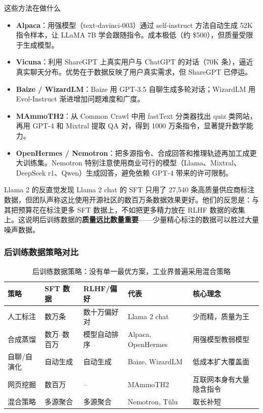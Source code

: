 \begin{knowledgebox}{这些方法在做什么}
\begin{itemize}
    \item \textbf{Alpaca}：用强模型（text-davinci-003）通过 self-instruct 方法自动生成 52K 指令样本，让 LLaMA 7B 学会跟随指令。成本极低（约 \$500），但质量受限于生成模型。
    \item \textbf{Vicuna}：利用 ShareGPT 上真实用户与 ChatGPT 的对话（70K 条），逼近真实聊天分布。优势在于数据反映了用户真实需求，但 ShareGPT 已停运。
    \item \textbf{Baize / WizardLM}：Baize 用 GPT-3.5 自聊生成多轮对话；WizardLM 用 Evol-Instruct 渐进增加问题难度和广度。
    \item \textbf{MAmmoTH2}：从 Common Crawl 中用 fastText 分类器找出 quiz 类网站，再用 GPT-4 和 Mixtral 提取 QA 对，得到 1000 万条指令，显著提升数学能力。
    \item \textbf{OpenHermes / Nemotron}：把多源指令、合成回答和推理轨迹再加工成更大训练集。Nemotron 特别注意使用商业可行的模型（Llama、Mixtral、DeepSeek r1、Qwen）生成回答，避免依赖 GPT-4 带来的许可限制。
\end{itemize}
\end{knowledgebox}

\begin{importantbox}{Llama 2 的反直觉发现}
Llama 2 chat 的 SFT 只用了 27,540 条高质量供应商标注数据，但团队声称这比使用开源社区的数百万条数据效果更好。他们的反思是：与其把预算花在标注更多 SFT 数据上，不如把更多精力放在 RLHF 数据的收集上。这说明后训练数据的\textbf{质量远比数量重要}——少量精心标注的数据可以胜过大量噪声数据。
\end{importantbox}

\subsubsection{后训练数据策略对比}

\begin{table}[H]
\centering
\begin{tabular}{p{}p{}p{}p{}p{}}
\toprule
\textbf{策略} & \textbf{SFT 数据} & \textbf{RLHF/偏好} & \textbf{代表} & \textbf{核心理念} \\
\midrule
人工标注 & 数万条 & 数十万偏好对 & Llama 2 chat & 少而精，质量为王 \\
合成蒸馏 & 数万--数百万 & 模型自动排序 & Alpaca, OpenHermes & 用强模型教弱模型 \\
自聊/自演化 & 自动生成 & 自动生成 & Baize, WizardLM & 低成本扩大覆盖面 \\
网页挖掘 & 数百万 & -- & MAmmoTH2 & 互联网本身有大量隐含指令 \\
混合策略 & 多源聚合 & 多源聚合 & Nemotron, T\"ulu & 取长补短 \\
\bottomrule
\end{tabular}
\caption{后训练数据策略：没有单一最优方案，工业界普遍采用混合策略}
\end{table}

